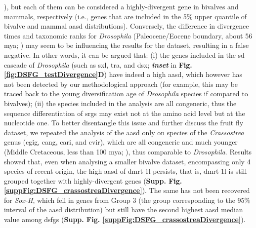 \documentclass[../main.tex]{subfiles}
\begin{document}
\textbf{\cite{foster1992evolution}}), but each of them can be considered a highly-divergent gene in bivalves and mammals, respectively (i.e., genes that are included in the 5\% upper quantile of bivalve and mammal \gls{aasd} distributions). Conversely, the difference in divergence times and taxonomic ranks for \textit{Drosophila} (Paleocene/Eocene boundary, about 56 \gls{mya}; \textbf{\cite{russo2013phylogenetic}}) may seem to be influencing the results for the dataset, resulting in a false negative. In other words, it can be argued that: (i) the genes included in the \gls{sd} cascade of \textit{Drosophila} (such as \gls{sxl}, \gls{tra}, and \gls{dsx}; \textbf{\textit{inset}} in \textbf{Fig. \ref{fig:DSFG_testDivergence}D}) have indeed a high \gls{aasd}, which however has not been detected by our methodological approach (for example, this may be traced back to the young diversification age of \textit{Drosophila} species if compared to bivalves); (ii) the species included in the analysis are all congeneric, thus the sequence differentiation of \glspl{srg} may exist not at the amino acid level but at the nucleotide one. To better disentangle this issue and further discuss the fruit fly dataset, we repeated the analysis of the \gls{aasd} only on species of the \textit{Crassostrea} genus (\gls{cgig}, \gls{cang}, \gls{cari}, and \gls{cvir}), which are all congeneric and much younger (Middle Cretaceous, less than 100 \gls{mya}; \textbf{\cite{qi2023construction}}), thus comparable to \textit{Drosophila}. Results showed that, even when analysing a smaller bivalve dataset, encompassing only 4 species of recent origin, the high \gls{aasd} of \gls{dmrt-1l} persists, that is, \gls{dmrt-1l} is still grouped together with highly-divergent genes (\textbf{Supp. Fig. \ref{suppFig:DSFG_crassostreaDivergence}}). The same has not been recovered for \textit{Sox-H}, which fell in genes from Group 3 (the group corresponding to the 95\% interval of the \gls{aasd} distribution) but still have the second highest \gls{aasd} median value among \glspl{dsfg} (\textbf{Supp. Fig. \ref{suppFig:DSFG_crassostreaDivergence}}).
\end{document}
